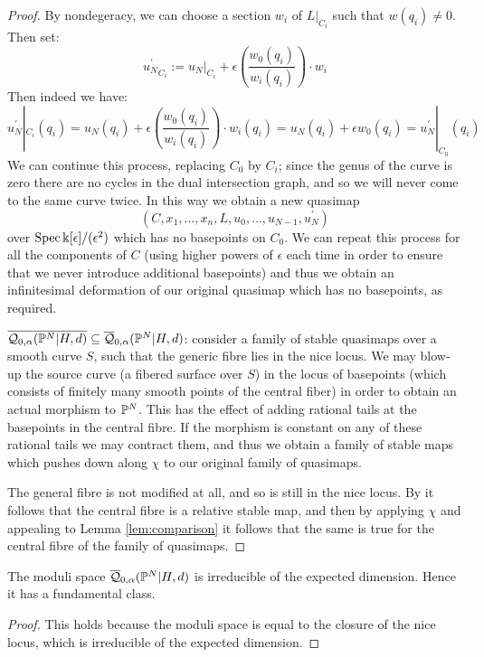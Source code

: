 \begin{proof}
By nondegeracy, we can choose a section $w_i$ of $L|_{C_i}$ such that $w(q_i) \neq 0$. Then set:
\begin{equation*} {u_N^\prime}_{C_i} := {u_N}|_{C_i} + \epsilon \left( \frac{w_0(q_i)}{w_i(q_i)} \right) \cdot w_i \end{equation*}
Then indeed we have:
\begin{equation*} {u_N^\prime}|_{C_i}(q_i) = u_N(q_i) + \epsilon \left( \frac{w_0(q_i)}{w_i(q_i)} \right) \cdot w_i(q_i) = u_N(q_i) + \epsilon w_0(q_i) = {u_N^\prime}|_{C_0}(q_i) \end{equation*}
We can continue this process, replacing $C_0$ by $C_i$; since the genus of the curve is zero there are no cycles in the dual intersection graph, and so we will never come to the same curve twice. In this way we obtain a new quasimap
\begin{equation*} (C,x_1,\ldots,x_n,L,u_0, \ldots, u_{N-1}, u_N^\prime) \end{equation*}
over $\operatorname{Spec} \Bbbk[\epsilon]/(\epsilon^2)$ which has no basepoints on $C_0$. We can repeat this process for all the components of $C$ (using higher powers of $\epsilon$ each time in order to ensure that we never introduce additional basepoints) and thus we obtain an infinitesimal deformation of our original quasimap which has no basepoints, as required.

$\overline{\mathcal Q_{0,\alpha}(\mathbb P^N|H,d)}\subseteq\overline{\mathcal Q}_{0,\alpha}(\mathbb P^N|H,d)$: consider a family of stable quasimaps over a smooth curve $S$, such that the generic fibre lies in the nice locus. We may blow-up the source curve (a fibered surface over $S$) in the locus of basepoints (which consists of finitely many smooth points of the central fiber) in order to obtain an actual morphism to $\mathbb P^N$. This has the effect of adding rational tails at the basepoints in the central fibre. If the morphism is constant on any of these rational tails we may contract them, and thus we obtain a family of stable maps which pushes down along $\chi$ to our original family of quasimaps.

The general fibre is not modified at all, and so is still in the nice locus. By \cite[Lemma 1.9]{Ga} it follows that the central fibre is a relative stable map, and then by applying $\chi$ and appealing to Lemma \ref{lem:comparison} it follows that the same is true for the central fibre of the family of quasimaps.
\end{proof}

\begin{cor} The moduli space $\overline{\mathcal Q}_{0,\alpha}(\mathbb P^N|H,d)$ is irreducible of the expected dimension. Hence it has a fundamental class. \end{cor}
\begin{proof} This holds because the moduli space is equal to the closure of the nice locus, which is irreducible of the expected dimension. \end{proof}

